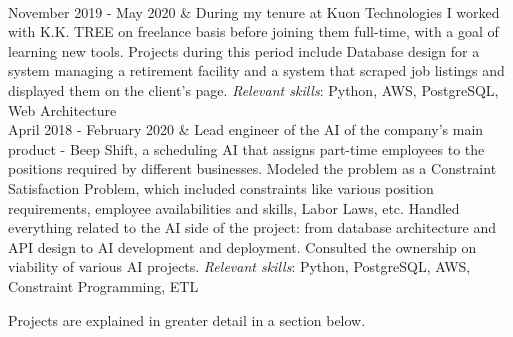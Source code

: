 \documentclass[]{cv-roald}
\begin{document}
\begin{tabularcv}
                    \\[\vspacepar]
   November 2019 - May 2020   & 
                    \newline During my tenure at Kuon Technologies I worked with K.K. TREE on freelance basis before joining them full-time, with a goal of learning new tools. Projects during this period include Database design for a system managing a retirement facility and a system that scraped job listings and displayed them on the client's page.
                    \newline \textit{Relevant skills}: Python, AWS, PostgreSQL, Web Architecture
                    \\[\vspacepar]
   April 2018 - February 2020       &   
                    \newline Lead engineer of the AI of the company's main product - Beep Shift, a scheduling AI that assigns part-time employees to the positions required by different businesses. Modeled the problem as a Constraint Satisfaction Problem, which included constraints like various position requirements, employee availabilities and skills, Labor Laws, etc.
                    \newline Handled everything related to the AI side of the project: from database architecture and API design to AI development and deployment.
                    \newline Consulted the ownership on viability of various AI projects.
                    \newline \textit{Relevant skills}: Python, PostgreSQL, AWS, Constraint Programming, ETL
\end{tabularcv}

Projects are explained in greater detail in a section below.
\end{document}
